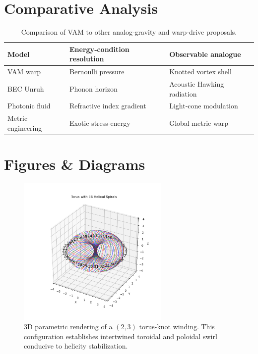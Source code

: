 \documentclass[preprint,notitlepage]{revtex4-2}
\begin{document}
\section{Comparative Analysis}
    \begin{table}[H]
    \centering
    \renewcommand{\arraystretch}{1.2}
    \begin{tabular}{|l|l|l|}
    \hline
    Model & Energy‐condition resolution & Observable analogue \\
    \hline
    VAM warp & Bernoulli pressure & Knotted vortex shell \\
    BEC Unruh & Phonon horizon & Acoustic Hawking radiation \\
    Photonic fluid & Refractive index gradient & Light‐cone modulation \\
    Metric engineering & Exotic stress‐energy & Global metric warp \\
    \hline
    \end{tabular}
    \caption{Comparison of VAM to other analog‐gravity and warp‐drive proposals.}
    \end{table}

\section{Figures \& Diagrams}
\begin{figure}[H]
  \centering
  \includegraphics[width=0.65\textwidth]{swirltorus3}
  \caption{3D parametric rendering of a $(2,3)$ torus-knot winding. This configuration establishes intertwined toroidal and poloidal swirl conducive to helicity stabilization.}
  \label{fig:torus36}
\end{figure}
\end{document}
